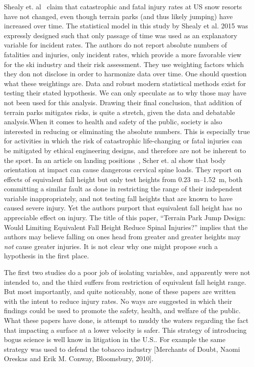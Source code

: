 \documentclass{article}
\begin{document}
Shealy et. al~\cite{Shealy2015} claim that catastrophic and
fatal injury rates at US snow resorts have not changed, even though terrain parks (and thus likely jumping) have increased over time. The statistical model in this study by Shealy et al. 2015 was expressly designed such that only passage of time was used as an explanatory
variable for incident rates. The authors do not report absolute numbers
of fatalities and injuries, only incident rates, which provide a more favorable
view for the ski industry and their risk assessment. They use weighting factors which they don not disclose in order to harmonize data over time. One should question what these weightings are.  Data and robust modern statistical methods exist for testing their stated hypothesis. We can only speculate
as to why those may have not been used for this analysis. Drawing their final
conclusion, that addition of terrain parks mitigates risks, is quite a stretch,
given the data and debatable analysis.When it comes to health
and safety of the public, society is also interested in reducing or eliminating
the absolute numbers. This is especially true for activities in which the risk of
catastrophic life-changing or fatal injuries can be mitigated by ethical engineering designs, and therefore are not be inherent to the sport. 
%
In an article on landing positions~\cite{Scher2015}, Scher et. al show that
body orientation at impact can cause dangerous cervical spine loads. They
report on effects of equivalent fall height but only test heights from
\SIrange{0.23}{1.52}{\meter}, both committing a similar fault as done in
\cite{Shealy2010} restricting the range of their independent variable inappropriately, and not testing fall heights that are known to have caused
severe injury. Yet the authors purport that equivalent fall height has no
appreciable effect on injury. The title of this paper, ``Terrain Park Jump
Design: Would Limiting Equivalent Fall Height Reduce Spinal Injuries?'' implies
that the authors may believe falling on ones head from greater and greater
heights may \emph{not} cause greater injuries. It is not clear why one might
propose such a hypothesis in the first place.

The first two studies do a poor job of isolating variables, and apparently were not
intended to, and the third suffers from restriction of equivalent fall height
range. But most importantly, and quite noticeably, none of these papers are
written with the intent to reduce injury rates. No ways are suggested in which
their findings could be used to promote the safety, health, and welfare of the
public. What these papers have done, is attempt to muddy the waters regarding the
fact that impacting a surface at a lower velocity is safer. This strategy of introducing bogus science is well know in litigation in the U.S.. For example the same strategy was used to defend the tobacco industry [Merchants of Doubt, Naomi Oreskas and Erik M. Conway, Bloomsbury, 2010].
\end{document}
